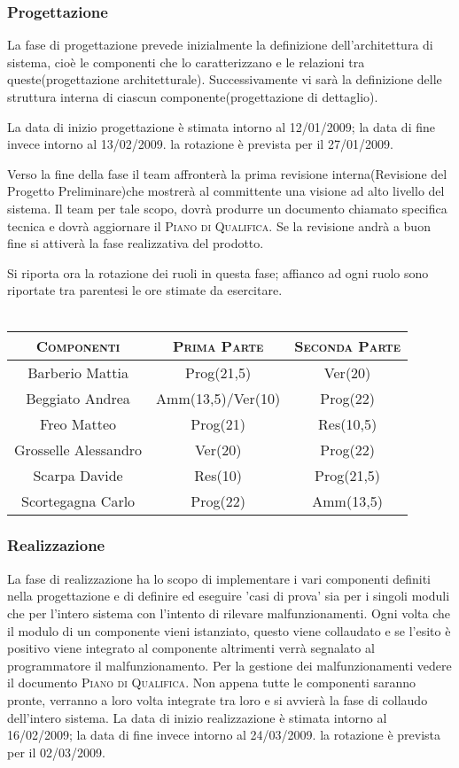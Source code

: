 \documentclass[11pt,a4paper]{article}
\begin{document}
\subsubsection{Progettazione}
La fase di progettazione prevede inizialmente la definizione dell'architettura di sistema, cioè le componenti che lo caratterizzano e le relazioni tra queste(progettazione architetturale).
Successivamente vi sarà la definizione delle struttura interna di ciascun componente(progettazione di dettaglio).

La data di inizio progettazione è stimata intorno al 12/01/2009; la data di fine invece intorno al 13/02/2009.
la rotazione è prevista per il 27/01/2009.

Verso la fine della fase il team affronterà la prima revisione interna(Revisione del Progetto Preliminare)che mostrerà al committente una visione ad alto livello del sistema. Il team per tale scopo, dovrà produrre un documento chiamato specifica tecnica e dovrà aggiornare il \textsc{Piano di Qualifica}. Se la revisione andrà a buon fine si attiverà la fase realizzativa del prodotto.

Si riporta ora la rotazione dei ruoli in questa fase; affianco ad ogni ruolo sono riportate tra parentesi le ore stimate da esercitare.\\\\
\begin{tabular}{|c|c|c|}
\hline
\textsc{Componenti} & \textsc{Prima Parte} & \textsc{Seconda Parte} \\ \hline \hline
Barberio Mattia & Prog(21,5) & Ver(20) \\ \hline
Beggiato Andrea & Amm(13,5)/Ver(10) & Prog(22) \\ \hline
Freo Matteo & Prog(21) & Res(10,5) \\ \hline
Grosselle Alessandro & Ver(20) & Prog(22) \\ \hline
Scarpa Davide & Res(10) & Prog(21,5) \\ \hline
Scortegagna Carlo & Prog(22) & Amm(13,5) \\ \hline
\end{tabular}
\subsubsection{Realizzazione}
La fase di realizzazione ha lo scopo di implementare i vari componenti definiti nella progettazione e di definire ed eseguire 'casi di prova' sia per i singoli moduli che per l'intero sistema con l'intento di rilevare malfunzionamenti.
Ogni volta che il modulo di un componente vieni istanziato, questo viene collaudato e se l'esito è positivo viene integrato al componente altrimenti verrà segnalato al programmatore il malfunzionamento. Per la gestione dei malfunzionamenti vedere il documento \textsc{Piano di Qualifica}.
Non appena tutte le componenti saranno pronte, verranno a loro volta integrate tra loro e si avvierà la fase di collaudo dell'intero sistema.  
La data di inizio realizzazione è stimata intorno al 16/02/2009; la data di fine invece intorno al 24/03/2009.
la rotazione è prevista per il 02/03/2009.
\end{document}
